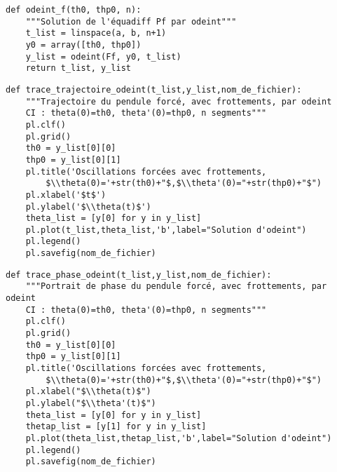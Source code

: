 \question{}
\begin{lstlisting}
def odeint_f(th0, thp0, n):
    """Solution de l'équadiff Pf par odeint"""
    t_list = linspace(a, b, n+1)
    y0 = array([th0, thp0])
    y_list = odeint(Ff, y0, t_list)
    return t_list, y_list
\end{lstlisting}

\question{}
\begin{lstlisting}
def trace_trajectoire_odeint(t_list,y_list,nom_de_fichier):
    """Trajectoire du pendule forcé, avec frottements, par odeint
    CI : theta(0)=th0, theta'(0)=thp0, n segments"""
    pl.clf()
    pl.grid()
    th0 = y_list[0][0]
    thp0 = y_list[0][1]
    pl.title('Oscillations forcées avec frottements, 
        $\\theta(0)='+str(th0)+"$,$\\theta'(0)="+str(thp0)+"$")
    pl.xlabel('$t$')
    pl.ylabel('$\\theta(t)$')
    theta_list = [y[0] for y in y_list]
    pl.plot(t_list,theta_list,'b',label="Solution d'odeint")
    pl.legend()
    pl.savefig(nom_de_fichier)
\end{lstlisting}

\question{}
\begin{lstlisting}
def trace_phase_odeint(t_list,y_list,nom_de_fichier):
    """Portrait de phase du pendule forcé, avec frottements, par odeint
    CI : theta(0)=th0, theta'(0)=thp0, n segments"""
    pl.clf()
    pl.grid()
    th0 = y_list[0][0]
    thp0 = y_list[0][1]
    pl.title('Oscillations forcées avec frottements, 
        $\\theta(0)='+str(th0)+"$,$\\theta'(0)="+str(thp0)+"$")
    pl.xlabel("$\\theta(t)$")
    pl.ylabel("$\\theta'(t)$")
    theta_list = [y[0] for y in y_list]
    thetap_list = [y[1] for y in y_list]
    pl.plot(theta_list,thetap_list,'b',label="Solution d'odeint")
    pl.legend()
    pl.savefig(nom_de_fichier) 
\end{lstlisting}
